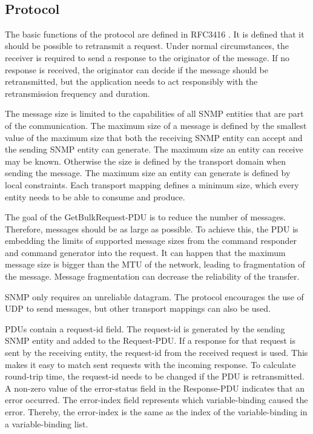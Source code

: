\newpage
~\newpage

\subsection{Protocol}
\label{Section:SNMP-Protocol}
The basic functions of the protocol are defined in RFC3416 \cite{RFC:RFC3416:2002}. It is defined that it should be possible to retransmit a request. Under normal circumstances, the receiver is required to send a response to the originator of the message. If no response is received, the originator can decide if the message should be retransmitted, but the application needs to act responsibly with the retransmission frequency and duration.

The message size is limited to the capabilities of all SNMP entities that are part of the communication. The maximum size of a message is defined by the smallest value of the maximum size that both the receiving SNMP entity can accept and the sending SNMP entity can generate. The maximum size an entity can receive may be known. Otherwise the size is defined by the transport domain when sending the message. The maximum size an entity can generate is defined by local constraints. Each transport mapping defines a minimum size, which every entity needs to be able to consume and produce.

The goal of the GetBulkRequest-PDU is to reduce the number of messages. Therefore, messages should be as large as possible. To achieve this, the PDU is embedding the limits of supported message sizes from the command responder and command generator into the request. It can happen that the maximum message size is bigger than the MTU of the network, leading to fragmentation of the message. Message fragmentation can decrease the reliability of the transfer.

SNMP only requires an unreliable datagram. The protocol encourages the use of UDP to send messages, but other transport mappings can also be used.

PDUs contain a request-id field. The request-id is generated by the sending SNMP entity and added to the Request-PDU. If a response for that request is sent by the receiving entity, the request-id from the received request is used. This makes it easy to match sent requests with the incoming response.  To calculate round-trip time, the request-id needs to be changed if the PDU is retransmitted. A non-zero value of the error-status field in the Response-PDU indicates that an error occurred. The error-index field represents which variable-binding caused the error. Thereby, the error-index is the same as the index of the variable-binding in a variable-binding list.

